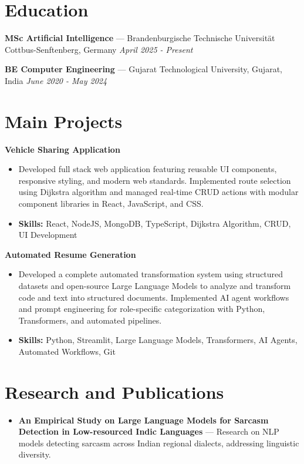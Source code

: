 \documentclass[a4paper,10pt]{article}
\begin{document}
\section*{Education}
\textbf{MSc Artificial Intelligence} — Brandenburgische Technische Universität Cottbus-Senftenberg, Germany \hfill \textit{April 2025 - Present}\par
\vspace{1.5pt}
\textbf{BE Computer Engineering} — Gujarat Technological University, Gujarat, India \hfill \textit{June 2020 - May 2024}\par

\section*{Main Projects}
\textbf{Vehicle Sharing Application}\par
\vspace{1pt}
\begin{itemize}
  \item Developed full stack web application featuring reusable UI components, responsive styling, and modern web standards. Implemented route selection using Dijkstra algorithm and managed real-time CRUD actions with modular component libraries in React, JavaScript, and CSS.
  \item \textbf{Skills:} React, NodeJS, MongoDB, TypeScript, Dijkstra Algorithm, CRUD, UI Development
\end{itemize}
\vspace{3pt}
\textbf{Automated Resume Generation}\par
\vspace{1pt}
\begin{itemize}
  \item Developed a complete automated transformation system using structured datasets and open-source Large Language Models to analyze and transform code and text into structured documents. Implemented AI agent workflows and prompt engineering for role-specific categorization with Python, Transformers, and automated pipelines.
  \item \textbf{Skills:} Python, Streamlit, Large Language Models, Transformers, AI Agents, Automated Workflows, Git
\end{itemize}

\section*{Research and Publications}
\begin{itemize}
\item \textbf{An Empirical Study on Large Language Models for Sarcasm Detection in Low-resourced Indic Languages} — Research on NLP models detecting sarcasm across Indian regional dialects, addressing linguistic diversity.
\end{itemize}
\end{document}
